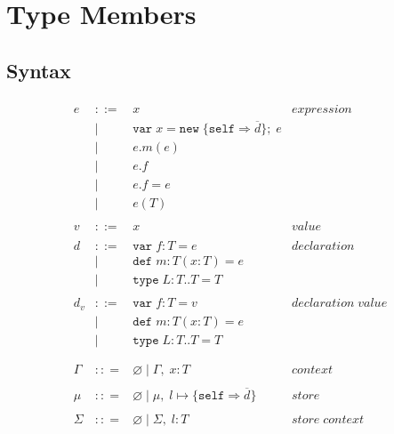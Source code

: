 \documentclass{llncs}
\begin{document}
\section{Type Members}

\subsection{Syntax}



\[
\begin{array}{lll}
\begin{array}{lllr}
e & ::= & x & expression \\
& | & \texttt{var} \; x = \texttt{new} \; \{\texttt{self} \Rightarrow \overline{d}\}; \; e&\\
& | & e.m(e) &\\
& | & e.f &\\
& | & e.f = e&\\
& | & e(T)&\\
&&\\
v & ::= & x & value \\
&&\\
d & ::= & \texttt{var} \; f : T = e & declaration \\
  & |   & \texttt{def} \; m : T(x:T) = e &\\
  & |   & \texttt{type} \; L : T .. T = T &\\
&&\\
d_v & ::= & \texttt{var} \; f : T = v & declaration \; value \\
  & |   & \texttt{def} \; m : T(x:T) = e &\\
  & |   & \texttt{type} \; L : T .. T = T &\\
&&\\
&&\\
\Gamma & :: = & \varnothing \; | \; \Gamma, \; x : T & context \\
&&\\
\mu & :: = & \varnothing \; | \; \mu,\; l \mapsto \{\texttt{self} \Rightarrow \overline{d}\} & store \\
&&\\
\Sigma & :: = & \varnothing \; | \; \Sigma,\; l : T & store \; context \\

\end{array}
\end{array}\]
\end{document}
